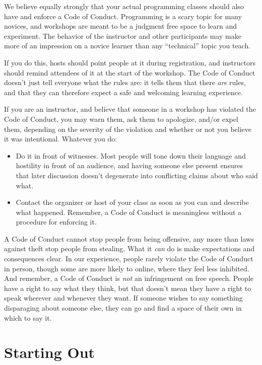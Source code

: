 \documentclass[10pt,statementpaper]{memoir}
\begin{document}
We believe equally strongly that your actual programming classes should
also have and enforce a Code of Conduct. Programming is a scary topic
for many novices, and workshops are meant to be a judgment free space to
learn and experiment. The behavior of the instructor and other
participants may make more of an impression on a novice learner than any
``technical'' topic you teach.

If you do this, hosts should point people at it during registration, and
instructors should remind attendees of it at the start of the workshop.
The Code of Conduct doesn't just tell everyone what the rules are: it
tells them that there \emph{are} rules, and that they can therefore
expect a safe and welcoming learning experience.

If you are an instructor, and believe that someone in a workshop has
violated the Code of Conduct, you may warn them, ask them to apologize,
and/or expel them, depending on the severity of the violation and
whether or not you believe it was intentional. Whatever you do:

\begin{itemize}
\item
  Do it in front of witnesses. Most people will tone down their language
  and hostility in front of an audience, and having someone else present
  ensures that later discussion doesn't degenerate into conflicting
  claims about who said what.
\item
  Contact the organizer or host of your class as soon as you can and
  describe what happened. Remember, a Code of Conduct is meaningless
  without a procedure for enforcing it.
\end{itemize}

A Code of Conduct cannot stop people from being offensive, any more than
laws against theft stop people from stealing. What it \emph{can} do is
make expectations and consequences clear. In our experience, people
rarely violate the Code of Conduct in person, though some are more
likely to online, where they feel less inhibited. And remember, a Code
of Conduct is \emph{not} an infringement on free speech. People have a
right to say what they think, but that doesn't mean they have a right to
speak wherever and whenever they want. If someone wishes to say
something disparaging about someone else, they can go and find a space
of their own in which to say it.

\section{Starting Out}\label{starting-out}
\end{document}
